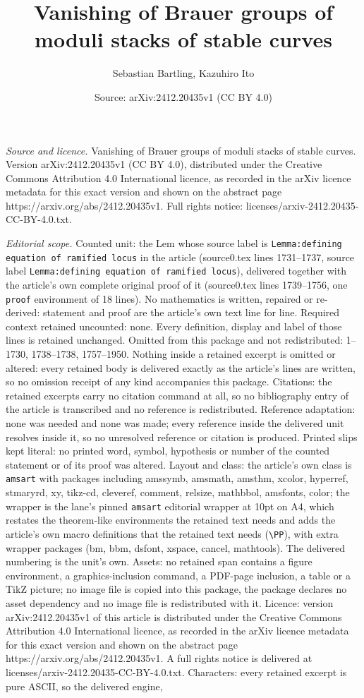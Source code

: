\documentclass[10pt,a4paper]{amsart}
\title[Vanishing of Brauer groups of moduli stacks of stable curves]{Vanishing of Brauer groups of moduli stacks of stable curves}
\author{Sebastian Bartling, Kazuhiro Ito}
\date{Source: arXiv:2412.20435v1 (CC BY 4.0)}
\begin{document}
\maketitle

\noindent\emph{Source and licence.} Vanishing of Brauer groups of moduli stacks of stable curves. Version arXiv:2412.20435v1 (CC BY 4.0), distributed under the Creative Commons Attribution 4.0 International licence, as recorded in the arXiv licence metadata for this exact version and shown on the abstract page https://arxiv.org/abs/2412.20435v1. Full rights notice: licenses/arxiv-2412.20435-CC-BY-4.0.txt.\par\smallskip

\noindent\textit{Editorial scope.} Counted unit: the Lem whose source label is \texttt{Lemma:defining equation of ramified locus} in the article (source0.tex lines 1731--1737, source label \texttt{Lemma:defining equation of ramified locus}), delivered together with the article's own complete original proof of it (source0.tex lines 1739--1756, one \texttt{proof} environment of 18 lines). No mathematics is written, repaired or re-derived: statement and proof are the article's own text line for line. Required context retained uncounted: none. Every definition, display and label of those lines is retained unchanged. Omitted from this package and not redistributed: 1--1730, 1738--1738, 1757--1950. Nothing inside a retained excerpt is omitted or altered: every retained body is delivered exactly as the article's lines are written, so no omission receipt of any kind accompanies this package. Citations: the retained excerpts carry no citation command at all, so no bibliography entry of the article is transcribed and no reference is redistributed. Reference adaptation: none was needed and none was made; every reference inside the delivered unit resolves inside it, so no unresolved reference or citation is produced. Printed slips kept literal: no printed word, symbol, hypothesis or number of the counted statement or of its proof was altered. Layout and class: the article's own class is \texttt{amsart} with packages including amssymb, amsmath, amsthm, xcolor, hyperref, stmaryrd, xy, tikz-cd, cleveref, comment, relsize, mathbbol, amsfonts, color; the wrapper is the lane's pinned \texttt{amsart} editorial wrapper at 10pt on A4, which restates the theorem-like environments the retained text needs and adds the article's own macro definitions that the retained text needs (\texttt{\textbackslash PP}), with extra wrapper packages (bm, bbm, dsfont, xspace, cancel, mathtools). The delivered numbering is the unit's own. Assets: no retained span contains a figure environment, a graphics-inclusion command, a PDF-page inclusion, a table or a TikZ picture; no image file is copied into this package, the package declares no asset dependency and no image file is redistributed with it. Licence: version arXiv:2412.20435v1 of this article is distributed under the Creative Commons Attribution 4.0 International licence, as recorded in the arXiv licence metadata for this exact version and shown on the abstract page https://arxiv.org/abs/2412.20435v1. A full rights notice is delivered at licenses/arxiv-2412.20435-CC-BY-4.0.txt. Characters: every retained excerpt is pure ASCII, so the delivered engine, 
\end{document}
